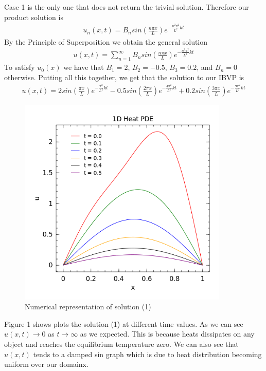 \documentclass[10pt]{article}
\begin{document}
Case 1 is the only one that does not return the trivial solution. Therefore our product solution is
\begin{align*}
u_n(x,t) = B_nsin(\frac{n\pi x}{L})e^{-\frac{n^2\pi^2}{L^2} kt}
\end{align*}
By the Principle of Superposition we obtain the general solution
\begin{align}
u(x,t) = \sum\limits_{n=1}^\infty B_nsin(\frac{n\pi x}{L})e^{-\frac{n^2\pi^2}{L^2} kt}
\end{align}
To satisfy $u_0(x)$ we have that $B_1 = 2$, $B_2 = -0.5$, $B_3 = 0.2$, and $B_n = 0$ otherwise. Putting all this together, we get that the solution to our IBVP is 
\begin{align}
u(x,t) = 2sin(\frac{\pi x}{L})e^{-\frac{\pi^2}{L^2} kt} - 0.5sin(\frac{2\pi x}{L})e^{-\frac{4\pi^2}{L^2} kt} + 0.2sin(\frac{3\pi x}{L})e^{-\frac{9\pi^2}{L^2} kt}
\end{align}

\begin{figure}[h]
\centering
\includegraphics[width=10cm]{HW2_3a.png}
\caption{Numerical representation of solution (1)}
\end{figure}

\noindent Figure 1 shows plots the solution (1) at different time values. As we can see $u(x,t) \rightarrow 0$ as $t \rightarrow \infty$ as we expected. This is because heats dissipates on any object and reaches the equilibrium temperature zero. We can also see that $u(x,t)$ tends to a damped sin graph which is due to heat distribution becoming uniform over our domainx.
\end{document}
